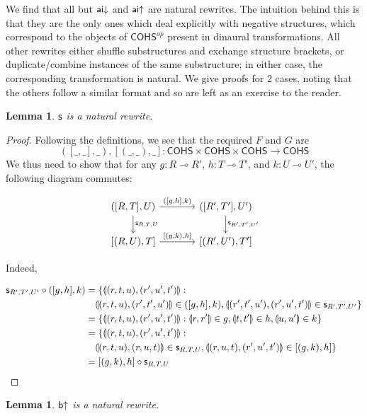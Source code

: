 \documentclass[11pt, oneside]{article}
\theoremstyle{plain}
\newtheorem{lemma}[theorem]{Lemma}
\theoremstyle{definition}
\newcommand{\lp}{\llparenthesis}
\newcommand{\rp}{\rrparenthesis}
\newcommand{\cohs}{{\mathsf{COHS}}}
\newcommand{\comp}{\mathbin{\circ}}
\begin{document}
We find that all but ${\mathsf {ai}}{\downarrow}$ and ${\mathsf {ai}}{ \uparrow}$ are natural rewrites.
The intuition behind this is that they are the only ones which deal explicitly with negative structures, which correspond to the objects of $\cohs^{op}$ present in dinaural transformations.
All other rewrites either shuffle substructures and exchange structure brackets, or duplicate/combine instances of the same substructure; in either case, the corresponding transformation is natural.
We give proofs for 2 cases, noting that the others follow a similar format and so are left as an exercise to the reader.

\begin{lemma}
${\mathsf s}$ is a natural rewrite.
\end{lemma}

\begin{proof}
Following the definitions, we see that the required $F$ and $G$ are
$$([\_,\_],\_),[(\_,\_),\_]:\cohs\times\cohs\times\cohs\to\cohs$$
We thus need to show that for any $g:R\multimap R'$, $h:T\multimap T'$, and $k:U\multimap U'$, the following diagram commutes:

\[
\begin{tikzcd}[column sep = large]
    ([R,T],U) \arrow[r,"{([g,h],k)}"]\arrow[d,"\sw_{R,T,U}"]& ([R',T'],U') \arrow[d,"\sw_{R',T',U'}"] \\
    {[(R,U),T]} \arrow[r,"{[(g,k),h]}"] & {[(R',U'),T']}
\end{tikzcd}
\]

Indeed,

\begin{align*}
\sw_{R',T',U'}\comp ([g,h],k) &= \{\lp(r,t,u),(r',u',t')\rp: \\
&\quad\lp(r,t,u),(r',t',u')\rp\in([g,h],k),\lp(r',t',u'),(r',u',t')\rp\in \sw_{R',T',U'}\} \\
&= \{\lp(r,t,u),(r',u',t')\rp:\lp r,r'\rp\in g, \lp t,t'\rp\in h, \lp u,u'\rp\in k\} \\
&= \{\lp(r,t,u),(r',u',t')\rp: \\
&\quad\lp(r,t,u),(r,u,t)\rp\in \sw_{R,T,U},\lp(r,u,t),(r',u',t')\rp\in[(g,k),h]\} \\
&= [(g,k),h]\comp \sw_{R,T,U}
\end{align*}
\end{proof}

\begin{lemma}
${\mathsf b}{ \uparrow}$ is a natural rewrite.
\end{lemma}
\end{document}
